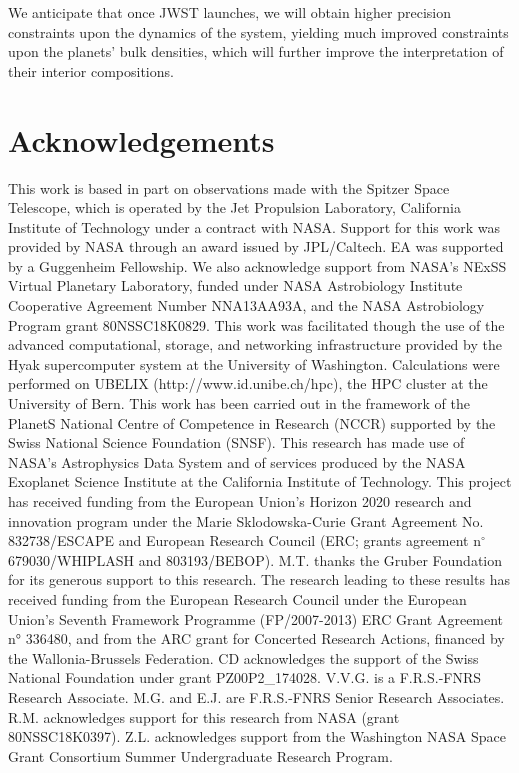 \documentclass[twocolumn]{aastex63}
\begin{document}
We anticipate that once JWST launches, we will obtain higher precision constraints upon the dynamics of the system, yielding much improved constraints upon the planets' bulk densities, which will further improve the interpretation of their interior compositions.

\section*{Acknowledgements}

This work is based in part on observations made with the Spitzer Space Telescope, which
is operated by the Jet Propulsion Laboratory, California Institute of Technology under
a contract with NASA. Support for this work was provided by NASA through an award issued
by JPL/Caltech.  EA was supported by a Guggenheim Fellowship.
We also acknowledge support from NASA's NExSS Virtual Planetary Laboratory, funded under
NASA Astrobiology Institute Cooperative Agreement Number NNA13AA93A, and the NASA Astrobiology
Program grant 80NSSC18K0829.
This work was facilitated though the use of the advanced computational, storage, and
networking infrastructure provided by the Hyak supercomputer system at the University of
Washington. Calculations were performed on UBELIX (http://www.id.unibe.ch/hpc), the HPC
cluster at the University of Bern. This work has been carried out in the framework of the PlanetS National Centre
of Competence in Research (NCCR) supported by the Swiss National Science Foundation (SNSF).
This research has made use of NASA's Astrophysics Data System and of services produced by
the NASA Exoplanet Science Institute at the California Institute of Technology.
This project has received funding from the European Union’s Horizon 2020 research and
innovation program under the Marie Sklodowska-Curie Grant Agreement No. 832738/ESCAPE and European Research Council (ERC; grants agreement n$^\circ$ 679030/WHIPLASH and 803193/BEBOP). M.T.
thanks the Gruber Foundation for its generous support to this research.
The research leading to these results has received funding from the European Research Council
under the European Union's Seventh Framework Programme (FP/2007-2013) ERC Grant
Agreement n° 336480, and from the ARC grant for Concerted Research Actions, financed by the
Wallonia-Brussels Federation. CD acknowledges the support of the Swiss National Foundation under grant PZ00P2\_174028. V.V.G. is a F.R.S.-FNRS Research Associate. M.G. and E.J. are F.R.S.-FNRS Senior Research Associates. R.M. acknowledges support for this research from NASA (grant 80NSSC18K0397). Z.L. acknowledges support from the Washington NASA Space Grant Consortium Summer Undergraduate Research Program.
\end{document}
